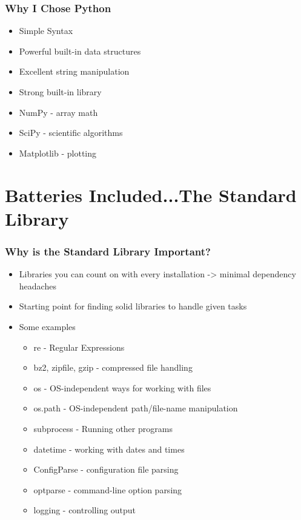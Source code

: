 \documentclass[red, hyperref={pdfpagelabels=false}]{beamer}
\begin{document}
\begin{frame}
  \frametitle{Why I Chose Python}
  \begin{itemize}
    \item Simple Syntax
    \item Powerful built-in data structures
    \item Excellent string manipulation
    \item Strong built-in library
    \item NumPy - array math
    \item SciPy - scientific algorithms
    \item Matplotlib - plotting
  \end{itemize}
\end{frame}

\section[The Standard Library]{Batteries Included...The Standard Library}
\begin{frame}
  \frametitle{Why is the Standard Library Important?}
  \begin{itemize}
    \item<1-> Libraries you can count on with every installation -> minimal dependency headaches
    \item<2-> Starting point for finding solid libraries to handle given tasks
    \item<3-> Some examples
      \begin{itemize}
        \item re - Regular Expressions
        \item bz2, zipfile, gzip - compressed file handling
        \item os - OS-independent ways for working with files
        \item os.path - OS-independent path/file-name manipulation
        \item subprocess - Running other programs
        \item datetime - working with dates and times
        \item \alert<4->{ConfigParse} - configuration file parsing
        \item \alert<4->{optparse} - command-line option parsing
        \item \alert<4->{logging} - controlling output
      \end{itemize}
  \end{itemize}
\end{frame}
\end{document}

